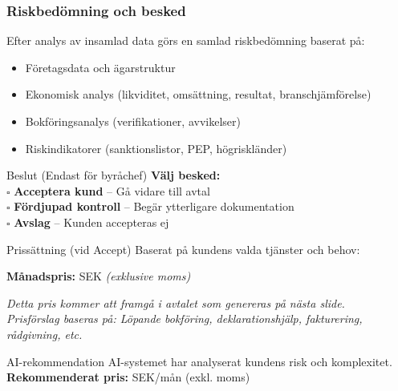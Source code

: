 \documentclass[10pt]{beamer}
\begin{document}
\begin{frame}[label=riskbesked]
  \frametitle{Riskbedömning och besked}
  \small
  Efter analys av insamlad data görs en samlad riskbedömning baserat på:
  
  \vspace{0.3cm}
  \begin{itemize}
    \footnotesize
    \item Företagsdata och ägarstruktur
    \item Ekonomisk analys (likviditet, omsättning, resultat, branschjämförelse)
    \item Bokföringsanalys (verifikationer, avvikelser)
    \item Riskindikatorer (sanktionslistor, PEP, högriskländer)
  \end{itemize}
  
  \vspace{0.4cm}
  \begin{block}{Beslut (Endast för byråchef)}
    \footnotesize
    \textbf{Välj besked:}\\
    \vspace{0.2cm}
    $\square$ \textbf{Acceptera kund} – Gå vidare till avtal\\
    $\square$ \textbf{Fördjupad kontroll} – Begär ytterligare dokumentation\\
    $\square$ \textbf{Avslag} – Kunden accepteras ej\\
  \end{block}
  
  \vspace{0.4cm}
  \begin{block}{Prissättning (vid Accept)}
    \footnotesize
    Baserat på kundens valda tjänster och behov:
    \vspace{0.3cm}
    
    \textbf{Månadspris:} \underline{\hspace{4cm}} SEK \textit{(exklusive moms)}\\
    \vspace{0.2cm}
    
    \textit{Detta pris kommer att framgå i avtalet som genereras på nästa slide.}\\
    \textit{Prisförslag baseras på: Löpande bokföring, deklarationshjälp, fakturering, rådgivning, etc.}
  \end{block}
  
  \vspace{0.4cm}
  \begin{block}{AI-rekommendation}
    \footnotesize
    AI-systemet har analyserat kundens risk och komplexitet.\\
    \textbf{Rekommenderat pris:} \underline{\hspace{3cm}} SEK/mån (exkl. moms)
  \end{block}
  
  \vspace{0.4cm}
  \begin{flushright}
    \hyperlink{skyldigheter}{}
  \end{flushright}
\end{frame}
\end{document}
